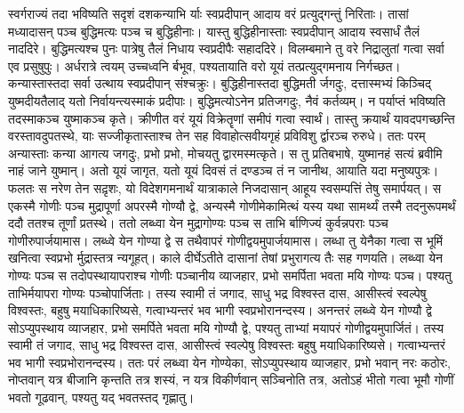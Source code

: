 \adhyAya

\vakya स्वर्गराज्यं तदा भविष्यति सदृशं दशकन्याभि र्याः स्वप्रदीपान् आदाय वरं प्रत्युद्गन्तुं निरिताः।
\vakya तासां मध्यादासन् पञ्च बुद्धिमत्यः पञ्च च बुद्धिहीनाः।
\vakya यास्तु बुद्धिहीनास्ताः स्वप्रदीपान् आदाय स्वसार्धं तैलं नाददिरे।
\vakya बुद्धिमत्यश्च पुनः पात्रेषु तैलं निधाय स्वप्रदीपैः सहाददिरे।
\vakya विलम्बमाने तु वरे निद्रालुतां गत्वा सर्वा एव प्रसुषुपुः।
\vakya अर्धरात्रे त्वयम् उच्चध्वनि र्बभूव, पश्यतायाति वरो यूयं तत्प्रत्युद्गमनाय निर्गच्छत।
\vakya कन्यास्तास्तदा सर्वा उत्थाय स्वप्रदीपान् संश्चक्रुः।
\vakya बुद्धिहीनास्तदा बुद्धिमती र्जगदुः, दत्तास्मभ्यं किञ्चिद् युष्मदीयतैलाद् यतो निर्वायन्त्यस्माकं प्रदीपाः।
\vakya बुद्धिमत्योऽनेन प्रतिजगदुः, नैवं कर्तव्यम्। न पर्याप्तं भविष्यति तदस्माकञ्च युष्माकञ्च कृते। क्रीणीत वरं यूयं विक्रेतॄणां समीपं गत्वा स्वार्थं।
\vakya तास्तु क्रयार्थं यावदपगच्छन्ति वरस्तावदुपतस्थे, याः सज्जीकृतास्ताश्च तेन सह विवाहोत्सवीयगृहं प्रविविशु र्द्वारञ्च रुरुधे।
\vakya ततः परम् अन्यास्ताः कन्या आगत्य जगदुः, प्रभो प्रभो, मोचयतु द्वारमस्मत्कृते।
\vakya स तु प्रतिबभाषे, युष्मानहं सत्यं ब्रवीमि नाहं जाने युष्मान्।
\vakya अतो यूयं जागृत, यतो यूयं दिवसं तं दण्डञ्च तं न जानीथ, आयाति यदा मनुष्यपुत्रः।
\vakya फलतः स नरेण तेन सद़ृशः, यो विदेशगमनार्थं यात्राकाले निजदासान् आहूय स्वसम्पत्तिं तेषु समार्पयत्।
\vakya स एकस्मै गोणीः पञ्च मुद्रापूर्णा अपरस्मै गोण्यौ द्वे, अन्यस्मै गोणीमेकामित्थं यस्य यथा सामर्थ्यं तस्मै तदनुरूपमर्थं ददौ ततश्च तूर्णां प्रतस्थे।
\vakya ततो लब्ध्वा येन मुद्रागोण्यः पञ्च स ताभि र्बाणिज्यं कुर्वन्नपराः पञ्च गोणीरुपार्जयामास।
\vakya लब्ध्वे येन गोण्या द्वे स तथैवापरं गोणीद्वयमुपार्जयामास।
\vakya लब्धा तु येनैका गत्वा स भूमिं खनित्वा स्वप्रभो र्मुद्रास्तत्र न्यगूहत्।
\vakya काले दीर्घेऽतीते दासानां तेषां प्रभुरागत्य तैः सह गणयति।
\vakya लब्ध्वा येन गोण्यः पञ्च स तदोपस्थायापराश्च गोणीः पञ्चानीय व्याजहार, प्रभो समर्पिता भवता मयि गोण्यः पञ्च। पश्यतु ताभिर्मयापरा गोण्यः पञ्चोपार्जिताः।
\vakya तस्य स्वामी तं जगाद, साधु भद्र विश्वस्त दास, आसीस्त्वं स्वल्पेषु विश्वस्तः, बहुषु मयाधिकारिष्यसे, गत्वाभ्यन्तरं भव भागी स्वप्रभोरानन्दस्य।
\vakya अनन्तरं लब्ध्वे येन गोण्यौ द्वे सोऽप्युपस्थाय व्याजहार, प्रभो समर्पिते भवता मयि गोण्यौ द्वे, पश्यतु ताभ्यां मयापरं गोणीद्वयमुपार्जितं।
\vakya तस्य स्वामी तं जगाद, साधु भद्र विश्वस्त दास, आसीस्त्वं स्वल्पेषु विश्वस्तः बहुषु मयाधिकारिष्यसे। गत्वाभ्यन्तरं भव भागी स्वप्रभोरानन्दस्य।
\vakya ततः परं लब्ध्वा येन गोण्येका, सोऽप्युपस्थाय व्याजहार, प्रभो भवान् नरः कठोरः, नोप्तवान् यत्र बीजानि कृन्तति तत्र शस्यं, न यत्र विकीर्णवान् सञ्चिनोति तत्र,
\vakya अतोऽहं भीतो गत्वा भूमौ गोणीं भवतो गूढवान्, पश्यतु यद् भवतस्तद् गृह्णातु।
